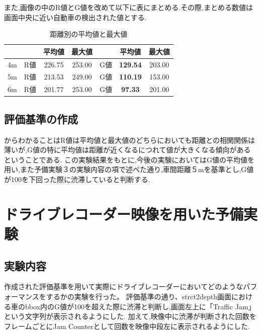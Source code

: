 
また,画像の中のR値とG値を改めて以下に表にまとめる.その際,まとめる数値は画面中央に近い自動車の検出された値とする.

\begin{table}[htbp]
  \centering
  \begin{scriptsize}
  \begin{tabular}{ccccccc}
  \toprule
& & 平均値 & 最大値 & & 平均値 & 最大値 \\
  \midrule
4m & R値 & 226.75 & 253.00 & G値 & {\bf129.54} & 203.00 \\
5m & R値 & 213.53 & 249.00 & G値 & {\bf 110.19} & 153.00 \\
6m & R値 & 201.77 & 253.00 & G値 & {\bf 97.33} & 201.00\\
  \bottomrule
  \end{tabular}
  \end{scriptsize}
  \caption{距離別の平均値と最大値}
  \label{tab:mean_max}
\end{table}

\subsection{評価基準の作成}
からわかることはR値は平均値と最大値のどちらにおいても距離との相関関係は薄いが,G値の特に平均値は距離が近くなるにつれて値が大きくなる傾向があるということである.
この実験結果をもとに,今後の実験においてはG値の平均値を用い,また予備実験３の実験内容の項で述べた通り,車間距離５mを基準とし,G値が100を下回った際に渋滞していると判断する.

\section{ドライブレコーダー映像を用いた予備実験}
\subsection{実験内容}
作成された評価基準を用いて実際にドライブレコーダーにおいてどのようなパフォーマンスをするかの実験を行った。
評価基準の通り、strct2depth画面における車のbbox内のG値が100を超えた際に渋滞と判断し,画面左上に「Traffic Jam」という文字列が表示されるようにした.
加えて,映像中に渋滞が判断された回数をフレームごとにJam Counterとして回数を映像中段左に表示されるようにした.


